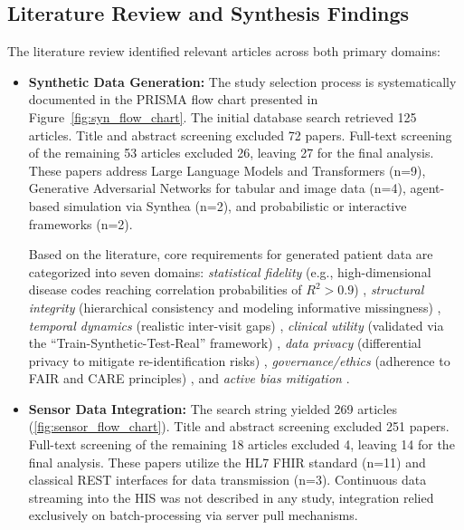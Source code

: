 \subsection*{Literature Review and Synthesis Findings}
The literature review identified relevant articles across both primary domains:

\begin{itemize}
\item \textbf{Synthetic Data Generation:} 
The study selection process is systematically documented in the PRISMA flow chart \citep{Pagen160} presented in Figure~\ref{fig:syn_flow_chart}. The initial database search retrieved 125 articles. Title and abstract screening excluded 72 papers. Full-text screening of the remaining 53 articles excluded 26, leaving 27 for the final analysis. These papers address Large Language Models and Transformers (n=9), Generative Adversarial Networks for tabular and image data (n=4), agent-based simulation via Synthea (n=2), and probabilistic or interactive frameworks (n=2).

Based on the literature, core requirements for generated patient data are categorized into seven domains: \textit{statistical fidelity} (e.g., high-dimensional disease codes reaching correlation probabilities of $R^2 > 0.9$) \citep{chen_generating_2025, theodorou_synthesize_2023}, \textit{structural integrity} (hierarchical consistency and modeling informative missingness) \citep{josling_novel_2026}, \textit{temporal dynamics} (realistic inter-visit gaps) \citep{josling_novel_2026, theodorou_synthesize_2023}, \textit{clinical utility} (validated via the \enquote{Train-Synthetic-Test-Real} framework) \citep{theodorou_synthesize_2023, jung_clinical_2025}, \textit{data privacy} (differential privacy to mitigate re-identification risks) \citep{tsao_health_2023, hahn_contribution_2022} \citep{chen_generating_2025}, \textit{governance/ethics} (adherence to FAIR and CARE principles) \citep{tsao_health_2023}, and \textit{active bias mitigation} \citep{theodorou_synthesize_2023}.

\item \textbf{Sensor Data Integration:} 
The search string yielded 269 articles (\ref{fig:sensor_flow_chart}). Title and abstract screening excluded 251 papers. Full-text screening of the remaining 18 articles excluded 4, leaving 14 for the final analysis. These papers utilize the HL7 FHIR standard (n=11) and classical REST interfaces for data transmission (n=3). Continuous data streaming into the HIS was not described in any study, integration relied exclusively on batch-processing via server pull mechanisms.
\end{itemize}

